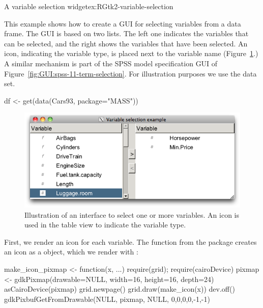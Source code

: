 \begin{example}{A variable selection widget}{ex:RGtk2-variable-selection}


This example shows how to create a GUI for selecting variables from a
data frame. The GUI is based on two lists. The left one indicates the
variables that can be selected, and the right shows the variables that
have been selected. An icon, indicating the variable type, is placed
next to the variable name (Figure~\ref{fig:RGtk2-select-variables}.) A
similar mechanism is part of the SPSS model specification GUI of
Figure~\ref{fig:GUI:spss-11-term-selection}. For illustration purposes
we use the  data set.
\begin{Schunk}
\begin{Sinput}
 df <- get(data(Cars93, package="MASS"))
\end{Sinput}
\end{Schunk}


\begin{figure}
  \centering
  \includegraphics[width=.8\textwidth]{fig-RGtk2-select-variables}
  \caption{Illustration of an interface to select one or more
    variables. An icon is used in the table view to indicate the
    variable type.}
  \label{fig:RGtk2-select-variables}
\end{figure}

First, we render an icon for each variable.  The 
function from the  package creates an icon as a
 object, which we render with :
% 
\begin{Schunk}
\begin{Sinput}
 make_icon_pixmap <- function(x, ...) {
   require(grid); require(cairoDevice)
   pixmap <- gdkPixmap(drawable=NULL, width=16, height=16, 
   depth=24)
   asCairoDevice(pixmap)
   grid.newpage()
   grid.draw(make_icon(x))
   dev.off()
   gdkPixbufGetFromDrawable(NULL, pixmap, NULL, 0,0,0,0,-1,-1)
 }
\end{Sinput}
\end{Schunk}


\end{example}
